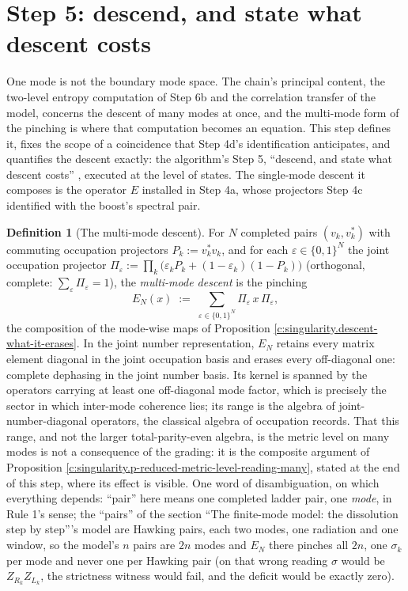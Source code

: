 \documentclass[11pt]{article}
\theoremstyle{definition}
\newtheorem{definition}[theorem]{Definition}
\theoremstyle{plain}
\providecommand{\EN}{}\renewcommand{\EN}{E_{N}}
\begin{document}
\section{Step 5: descend, and state what descent costs}

\label{c:note.singularity.setting-step-5-descend-state-what}
One mode is not the boundary mode space. The chain's principal content, the two-level entropy computation of Step 6b and the correlation transfer of the model, concerns the descent of many modes at once, and the multi-mode form of the pinching is where that computation becomes an equation. This step defines it, fixes the scope of a coincidence that Step 4d's identification anticipates, and quantifies the descent exactly: the algorithm's Step 5, ``descend, and state what descent costs'' \cite[\S 8.1, Step 5]{ButlerT1}, executed at the level of states. The single-mode descent it composes is the operator $E$ installed in Step 4a, whose projectors Step 4c identified with the boost's spectral pair.

\begin{definition}[The multi-mode descent]\label{c:obj.singularity.multi-mode-descent}
For $N$ completed pairs $(v_k, v_k^*)$ with commuting occupation projectors $P_k := v_k^* v_k$, and for each $\varepsilon \in \{0,1\}^N$ the joint occupation projector $\Pi_\varepsilon := \prod_k \bigl(\varepsilon_k P_k + (1 - \varepsilon_k)(1 - P_k)\bigr)$ (orthogonal, complete: $\sum_\varepsilon \Pi_\varepsilon = 1$), the \emph{multi-mode descent} is the pinching
\[
\EN(x) \;:=\; \sum_{\varepsilon \in \{0,1\}^N} \Pi_\varepsilon\, x\, \Pi_\varepsilon ,
\]
the composition of the mode-wise maps of Proposition \ref{c:singularity.descent-what-it-erases}. In the joint number representation, $\EN$ retains every matrix element diagonal in the joint occupation basis and erases every off-diagonal one: complete dephasing in the joint number basis. Its kernel is spanned by the operators carrying at least one off-diagonal mode factor, which is precisely the sector in which inter-mode coherence lies; its range is the algebra of joint-number-diagonal operators, the classical algebra of occupation records. That this range, and not the larger total-parity-even algebra, is the metric level on many modes is not a consequence of the grading: it is the composite argument of Proposition \ref{c:singularity.p-reduced-metric-level-reading-many}, stated at the end of this step, where its effect is visible. One word of disambiguation, on which everything depends: ``pair'' here means one completed ladder pair, one \emph{mode}, in Rule 1's sense; the ``pairs'' of the section ``The finite-mode model: the dissolution step by step'''s model are Hawking pairs, each two modes, one radiation and one window, so the model's $n$ pairs are $2n$ modes and $\EN$ there pinches all $2n$, one $\sigma_k$ per mode and never one per Hawking pair (on that wrong reading $\sigma$ would be $Z_{R_k}Z_{L_k}$, the strictness witness would fail, and the deficit would be exactly zero).
\end{definition}
\end{document}
